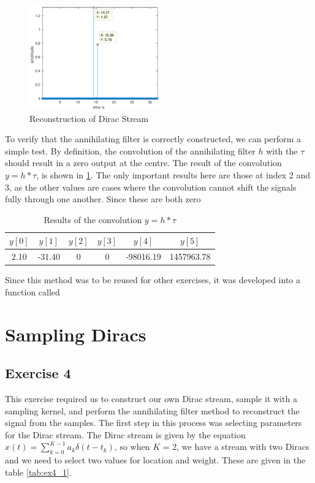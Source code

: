\documentclass[a4paper]{article}
\begin{document}
\begin{figure}[H]
    \centering
    \includegraphics[width=0.5\textwidth]{../images/ex3}
    \caption{Reconstruction of Dirac Stream}
    \label{fig:ex3_1}
\end{figure}

To verify that the annihilating filter is correctly constructed, we can perform a simple test. By definition, the convolution of the annihilating filter $h$ with the  $\tau$ should result in a zero output at the centre. The result of the convolution $y = h*\tau$, is shown in \ref{tab:ex3_3}. The only important results here are those at index 2 and 3, as the other values are cases where the convolution cannot shift the signals fully through one another. Since these are both zero

\begin{table}[H]
    \centering
    \begin{tabular}{|c|c|c|c|c|c|}
        \hline
		$y[0]$ & $y[1]$ & $y[2]$ & $y[3]$ & $y[4]$ & $y[5]$ \\ \hline
		2.10 & -31.40 & 0 & 0 & -98016.19 & 1457963.78 \\ \hline

    \end{tabular}
    \caption{Results of the convolution $y = h*\tau$}
    \label{tab:ex3_3}
\end{table}

Since this method was to be reused  for other exercises, it was developed into a function called 


\section{Sampling Diracs}
\subsection{Exercise 4}

This exercise required us to construct our own Dirac stream, sample it with a sampling kernel, and perform the annihilating filter method to reconstruct the signal from the samples. The first step in this process was selecting parameters for the Dirac stream. The Dirac stream is given by the equation $x(t) = \sum^{K-1}_{k=0} a_k\delta(t-t_k)$,  so when $K$ = 2, we have a stream with two Diracs and we need to select two values for location and weight. These are given in the table \ref{tab:ex4_1}.
\end{document}
